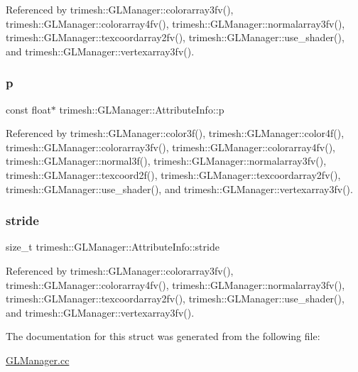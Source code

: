Referenced by trimesh\+::\+G\+L\+Manager\+::colorarray3fv(), trimesh\+::\+G\+L\+Manager\+::colorarray4fv(), trimesh\+::\+G\+L\+Manager\+::normalarray3fv(), trimesh\+::\+G\+L\+Manager\+::texcoordarray2fv(), trimesh\+::\+G\+L\+Manager\+::use\+\_\+shader(), and trimesh\+::\+G\+L\+Manager\+::vertexarray3fv().

\mbox{\label{structtrimesh_1_1GLManager_1_1AttributeInfo_afb56efa61e786631d2a5f317617eb0b1}} 
\subsubsection{\texorpdfstring{p}{p}}
{\footnotesize\ttfamily const float$\ast$ trimesh\+::\+G\+L\+Manager\+::\+Attribute\+Info\+::p}



Referenced by trimesh\+::\+G\+L\+Manager\+::color3f(), trimesh\+::\+G\+L\+Manager\+::color4f(), trimesh\+::\+G\+L\+Manager\+::colorarray3fv(), trimesh\+::\+G\+L\+Manager\+::colorarray4fv(), trimesh\+::\+G\+L\+Manager\+::normal3f(), trimesh\+::\+G\+L\+Manager\+::normalarray3fv(), trimesh\+::\+G\+L\+Manager\+::texcoord2f(), trimesh\+::\+G\+L\+Manager\+::texcoordarray2fv(), trimesh\+::\+G\+L\+Manager\+::use\+\_\+shader(), and trimesh\+::\+G\+L\+Manager\+::vertexarray3fv().

\mbox{\label{structtrimesh_1_1GLManager_1_1AttributeInfo_ae0c6b5d9b0e8b622546b9ee9e71e7223}} 
\subsubsection{\texorpdfstring{stride}{stride}}
{\footnotesize\ttfamily size\+\_\+t trimesh\+::\+G\+L\+Manager\+::\+Attribute\+Info\+::stride}



Referenced by trimesh\+::\+G\+L\+Manager\+::colorarray3fv(), trimesh\+::\+G\+L\+Manager\+::colorarray4fv(), trimesh\+::\+G\+L\+Manager\+::normalarray3fv(), trimesh\+::\+G\+L\+Manager\+::texcoordarray2fv(), trimesh\+::\+G\+L\+Manager\+::use\+\_\+shader(), and trimesh\+::\+G\+L\+Manager\+::vertexarray3fv().



The documentation for this struct was generated from the following file\+:\begin{DoxyCompactItemize}
\item 
\hyperlink{GLManager_8cc}{G\+L\+Manager.\+cc}\end{DoxyCompactItemize}
